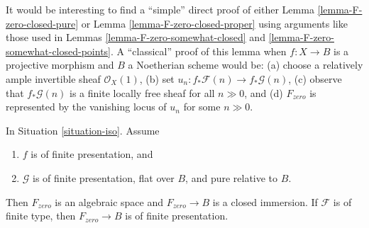 \noindent
It would be interesting to find a ``simple'' direct proof of either
Lemma \ref{lemma-F-zero-closed-pure} or
Lemma \ref{lemma-F-zero-closed-proper}
using arguments like those used in
Lemmas \ref{lemma-F-zero-somewhat-closed} and
\ref{lemma-F-zero-somewhat-closed-points}.
A ``classical'' proof of this lemma when $f : X \to B$ is a projective
morphism and $B$ a Noetherian scheme would be: (a) choose a relatively ample
invertible sheaf $\mathcal{O}_X(1)$, (b) set
$u_n : f_*\mathcal{F}(n) \to f_*\mathcal{G}(n)$,
(c) observe that $f_*\mathcal{G}(n)$ is a finite locally free sheaf
for all $n \gg 0$, and (d) $F_{zero}$ is represented by the vanishing
locus of $u_n$ for some $n \gg 0$.

\begin{lemma}
\label{lemma-F-zero-closed-pure}
In Situation \ref{situation-iso}. Assume
\begin{enumerate}
\item $f$ is of finite presentation, and
\item $\mathcal{G}$ is of finite presentation,
flat over $B$, and pure relative to $B$.
\end{enumerate}
Then $F_{zero}$ is an algebraic space and $F_{zero} \to B$
is a closed immersion. If $\mathcal{F}$ is of finite type, then
$F_{zero} \to B$ is of finite presentation.
\end{lemma}

